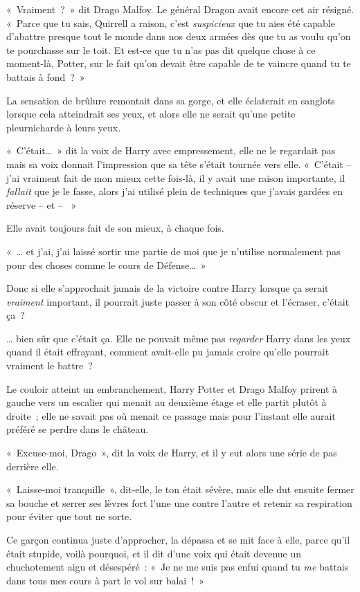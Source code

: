 «~Vraiment~?~» dit Drago Malfoy. Le général Dragon avait encore cet air résigné. «~Parce que tu sais, Quirrell a raison, c'est \emph{suspicieux} que tu aies été capable d'abattre presque tout le monde dans nos deux armées dès que tu as voulu qu'on te pourchasse sur le toit. Et est-ce que tu n'as pas dit quelque chose à ce moment-là, Potter, sur le fait qu'on devait être capable de te vaincre quand tu te battais à fond~?~»

La sensation de brûlure remontait dans sa gorge, et elle éclaterait en sanglots lorsque cela atteindrait ses yeux, et alors elle ne serait qu'une petite pleurnicharde à leurs yeux.

«~C'était…~» dit la voix de Harry avec empressement, elle ne le regardait pas mais sa voix donnait l'impression que sa tête s'était tournée vers elle. «~C'était -- j'ai vraiment fait de mon mieux cette fois-là, il y avait une raison importante, il \emph{fallait} que je le fasse, alors j'ai utilisé plein de techniques que j'avais gardées en réserve -- et -- ~»

Elle avait toujours fait de son mieux, à chaque fois.

«~… et j'ai, j'ai laissé sortir une partie de moi que je n'utilise normalement pas pour des choses comme le cours de Défense…~»

Donc si elle s'approchait jamais de la victoire contre Harry lorsque ça serait \emph{vraiment} important, il pourrait juste passer à son côté obscur et l'écraser, c'était ça~?

… bien sûr que c'était ça. Elle ne pouvait même pas \emph{regarder} Harry dans les yeux quand il était effrayant, comment avait-elle pu jamais croire qu'elle pourrait vraiment le battre~?

Le couloir atteint un embranchement, Harry Potter et Drago Malfoy prirent à gauche vers un escalier qui menait au deuxième étage et elle partit plutôt à droite~; elle ne savait pas où menait ce passage mais pour l'instant elle aurait préféré se perdre dans le château.

«~Excuse-moi, Drago~», dit la voix de Harry, et il y eut alors une série de pas derrière elle.

«~Laisse-moi tranquille~», dit-elle, le ton était sévère, mais elle dut ensuite fermer sa bouche et serrer ses lèvres fort l'une une contre l'autre et retenir sa respiration pour éviter que tout ne sorte.

Ce garçon continua juste d'approcher, la dépassa et se mit face à elle, parce qu'il était stupide, voilà pourquoi, et il dit d'une voix qui était devenue un chuchotement aigu et désespéré~: «~Je ne me suis pas enfui quand tu \emph{me} battais dans tous mes cours à part le vol sur balai~!~»

